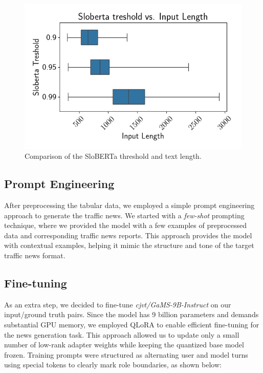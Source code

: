 \documentclass[fleqn,moreauthors,10pt]{ds_report}
\begin{document}
\begin{figure}[h]
    \centering
    \includegraphics[width=0.8\linewidth]{fig/treshold_vs_len.png}
    \caption{Comparison of the SloBERTa threshold and text length.}
    \label{fig:preprocessing}
\end{figure}





\subsection*{Prompt Engineering}

After preprocessing the tabular data, we employed a simple prompt engineering approach to generate the traffic news.
We started with a \textit{few-shot} prompting \cite{promptingguide_fewshot} technique, where we provided the model
with a few examples of preprocessed data and corresponding traffic news reports. This approach provides the model
with contextual examples, helping it mimic the structure and tone of the target traffic news format.

\subsection*{Fine-tuning}

As an extra step, we decided to fine-tune \textit{cjvt/GaMS-9B-Instruct} on our input/ground truth pairs. Since the model has 9 billion parameters and demands substantial GPU memory, we employed QLoRA to enable efficient fine-tuning for the news generation task. This approach allowed us to update only a small number of low-rank adapter weights while keeping the quantized base model frozen. Training prompts were structured as alternating user and model turns using special tokens to clearly mark role boundaries, as shown below:
\end{document}
